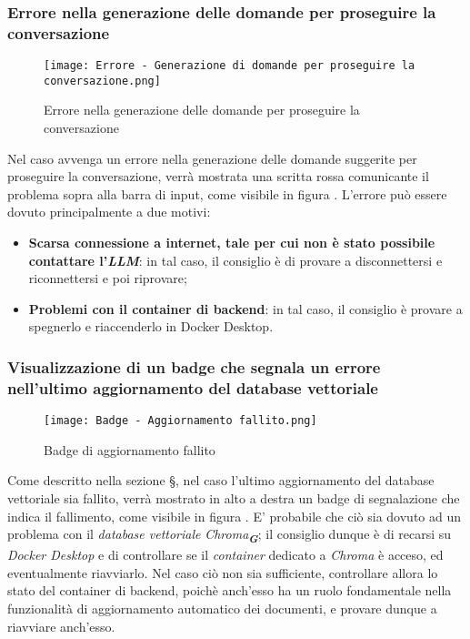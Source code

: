 \subsubsection{Errore nella generazione delle domande per proseguire la conversazione}

\begin{figure}[h]
    \centering
        \texttt{[image: Errore - Generazione di domande per proseguire la conversazione.png]}
        \caption{Errore nella generazione delle domande per proseguire la conversazione}
        \label{fig:Errore nella generazione delle domande per proseguire la conversazione}
\end{figure}

Nel caso avvenga un errore nella generazione delle domande suggerite per proseguire la conversazione, verrà mostrata una scritta rossa comunicante il problema sopra alla barra di input, come visibile in figura . L'errore può essere dovuto principalmente a due motivi:
\begin{itemize}
    \item \textbf{Scarsa connessione a internet, tale per cui non è stato possibile contattare l'\emph{LLM}}: in tal caso, il consiglio è di provare a disconnettersi e riconnettersi e poi riprovare;
    \item \textbf{Problemi con il container di backend}: in tal caso, il consiglio è provare a spegnerlo e riaccenderlo in Docker Desktop.
\end{itemize}


\subsubsection{Visualizzazione di un badge che segnala un errore nell'ultimo aggiornamento del database vettoriale}

\begin{figure}[h]
    \centering
        \texttt{[image: Badge - Aggiornamento fallito.png]}
        \caption{Badge di aggiornamento fallito}
        \label{fig:Badge di aggiornamento fallito}
\end{figure}

Come descritto nella sezione \S{}, nel caso l'ultimo aggiornamento del database vettoriale sia fallito, verrà mostrato in alto a destra un badge di segnalazione che indica il fallimento, come visibile in figura . E' probabile che ciò sia dovuto ad un problema con il \emph{database vettoriale} \emph{Chroma}\textsubscript{\textbf{\textit{G}}}; il consiglio dunque è di recarsi su \emph{Docker Desktop} e di controllare se il \emph{container} dedicato a \emph{Chroma} è acceso, ed eventualmente riavviarlo. Nel caso ciò non sia sufficiente, controllare allora lo stato del container di backend, poichè anch'esso ha un ruolo fondamentale nella funzionalità di aggiornamento automatico dei documenti, e provare dunque a riavviare anch'esso.


